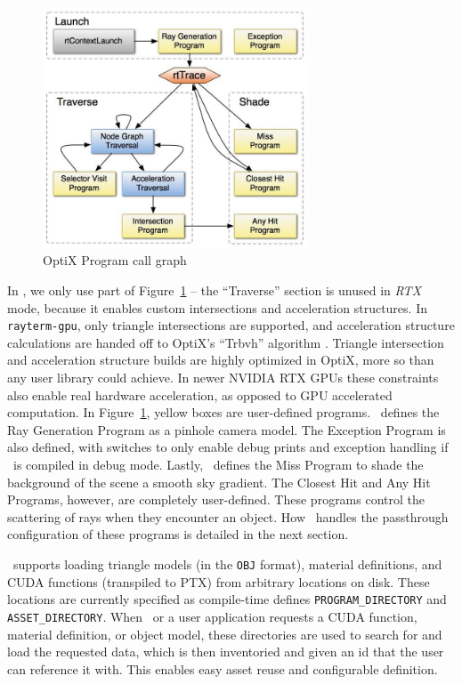 \vspace{0.3em}
\begin{figure}[htb]
  \centering
  \includegraphics[width=0.7\textwidth]{resources/optix_trace}
  \caption{OptiX Program call graph}
\label{fig:rayterm-gpu_optix_trace}
\end{figure}

In \name, we only use part of Figure~\ref{fig:rayterm-gpu_optix_trace} -- the ``Traverse'' section is unused in {\it RTX} mode, because it enables custom intersections and acceleration structures.
In \texttt{rayterm-gpu}, only triangle intersections are supported, and acceleration structure calculations are handed off to OptiX's ``Trbvh'' algorithm \cite{karras2013fast}.
Triangle intersection and acceleration structure builds are highly optimized in OptiX, more so than any user library could achieve.
In newer NVIDIA RTX GPUs these constraints also enable real hardware acceleration, as opposed to GPU accelerated computation.
In Figure~\ref{fig:rayterm-gpu_optix_trace}, yellow boxes are user-defined programs.
\name\ defines the Ray Generation Program as a pinhole camera model.
The Exception Program is also defined, with switches to only enable debug prints and exception handling if \name\ is compiled in debug mode.
Lastly, \name\ defines the Miss Program to shade the background of the scene a smooth sky gradient.
The Closest Hit and Any Hit Programs, however, are completely user-defined.
These programs control the scattering of rays when they encounter an object.
How \name\ handles the passthrough configuration of these programs is detailed in the next section.

\name\ supports loading triangle models (in the \texttt{OBJ} format), material definitions, and CUDA functions (transpiled to PTX) from arbitrary locations on disk.
These locations are currently specified as compile-time defines \texttt{PROGRAM\_DIRECTORY} and \texttt{ASSET\_DIRECTORY}.
When \name\ or a user application requests a CUDA function, material definition, or object model, these directories are used to search for and load the requested data, which is then inventoried and given an id that the user can reference it with.
This enables easy asset reuse and configurable definition.


